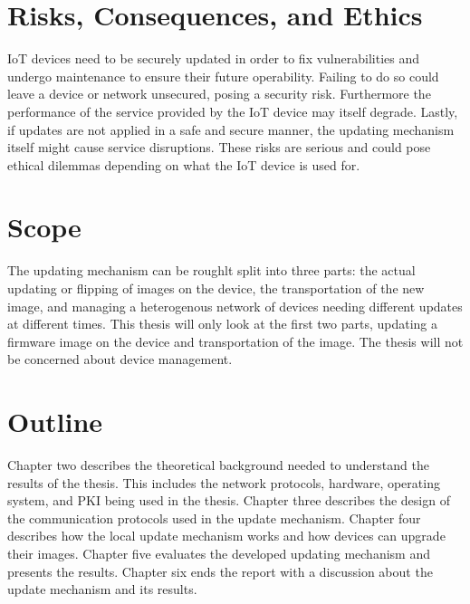\documentclass[0-thesis.tex]{subfiles}
\begin{document}
\section{Risks, Consequences, and Ethics}
IoT devices need to be securely updated in order to fix vulnerabilities and undergo
maintenance to ensure their future operability. Failing to do so could leave a device or
network unsecured, posing a security risk. Furthermore the performance of the service
provided by the IoT device may itself degrade. Lastly, if updates are not applied in a
safe and secure manner, the updating mechanism itself might cause service disruptions.
These risks are serious and could pose ethical dilemmas depending on what the IoT device
is used for.

\section{Scope}
The updating mechanism can be roughlt split into three parts: the actual updating or
flipping of images on the device, the transportation of the new image, and managing a
heterogenous network of devices needing different updates at different times. This thesis
will only look at the first two parts, updating a firmware image on the device and
transportation of the image. The thesis will not be concerned about device management.

\section{Outline}
Chapter two describes the theoretical background needed to understand the results of the
thesis. This includes the network protocols, hardware, operating system, and PKI being
used in the thesis. Chapter three describes the design of the communication protocols used
in the update mechanism. Chapter four describes how the local update mechanism works and
how devices can upgrade their images. Chapter five evaluates the developed updating
mechanism and presents the results. Chapter six ends the report with a discussion about
the update mechanism and its results.
\end{document}
